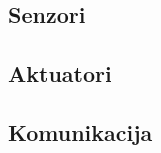 \documentclass[times, utf8, diplomski, numeric]{templates/template}
\begin{document}
{{        \subsection{Senzori}{
        }

        \subsection{Aktuatori}{
        }

        \subsection{Komunikacija}{
        }
    }
}
\end{document}
